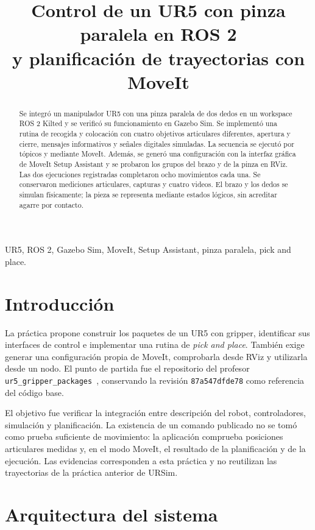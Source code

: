 \documentclass[conference]{IEEEtran}
\title{Control de un UR5 con pinza paralela en ROS 2\\
y planificación de trayectorias con MoveIt}
\author{\IEEEauthorblockN{Brayan Mateo Bravo Losada}
\IEEEauthorblockA{Ingeniería Electrónica\\
Escuela Colombiana de Ingeniería Julio Garavito\\
Robótica -- Corte 2, Práctica 2\\
Bogotá, Colombia}}
\begin{document}
\maketitle

\begin{abstract}
Se integró un manipulador UR5 con una pinza paralela de dos dedos en un
workspace ROS 2 Kilted y se verificó su funcionamiento en Gazebo Sim.
Se implementó una rutina de recogida y colocación con cuatro objetivos
articulares diferentes, apertura y cierre, mensajes informativos y señales
digitales simuladas. La secuencia se ejecutó por tópicos y mediante MoveIt.
Además, se generó una configuración con la interfaz gráfica de MoveIt Setup
Assistant y se probaron los grupos del brazo y de la pinza en RViz.
Las dos ejecuciones registradas completaron ocho movimientos cada una.
Se conservaron mediciones articulares, capturas y cuatro videos.
El brazo y los dedos se simulan físicamente; la pieza se representa
mediante estados lógicos, sin acreditar agarre por contacto.
\end{abstract}
\begin{IEEEkeywords}
UR5, ROS 2, Gazebo Sim, MoveIt, Setup Assistant, pinza paralela,
pick and place.
\end{IEEEkeywords}

\section{Introducción}
La práctica propone construir los paquetes de un UR5 con gripper,
identificar sus interfaces de control e implementar una rutina de
\textit{pick and place}. También exige generar una configuración propia
de MoveIt, comprobarla desde RViz y utilizarla desde un nodo.
El punto de partida fue el repositorio del profesor
\texttt{ur5\_gripper\_packages}~\cite{teacher}, conservando la revisión
\texttt{87a547dfde78} como referencia del código base.

El objetivo fue verificar la integración entre descripción del robot,
controladores, simulación y planificación. La existencia de un comando
publicado no se tomó como prueba suficiente de movimiento: la aplicación
comprueba posiciones articulares medidas y, en el modo MoveIt, el resultado
de la planificación y de la ejecución. Las evidencias corresponden a esta
práctica y no reutilizan las trayectorias de la práctica anterior de URSim.

\section{Arquitectura del sistema}
\end{document}
